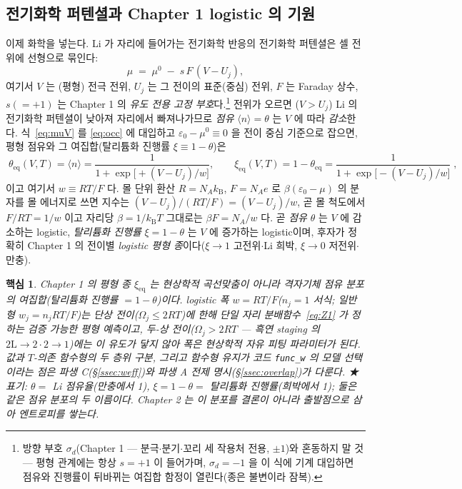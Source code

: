 \documentclass[11pt,a4paper]{article}
\newtheorem*{keybox}{핵심}
\newcommand{\eq}{\mathrm{eq}}
\newcommand{\kB}{k_{\mathrm B}}
\newcommand{\avg}[1]{\langle #1\rangle}
\begin{document}
\subsection{전기화학 퍼텐셜과 Chapter 1 logistic 의 기원}\label{ssec:logistic}
이제 화학을 넣는다. Li 가 자리에 들어가는 전기화학 반응의 전기화학 퍼텐셜은 셀 전위에 선형으로 묶인다:
\begin{equation}
\mu \;=\; \mu^0 \;-\; s\,F\,(V-U_j),
\label{eq:muV}
\end{equation}
여기서 $V$ 는 (평형) 전극 전위, $U_j$ 는 그 전이의 표준(중심) 전위, $F$ 는 Faraday 상수, $s(=+1)$ 는
Chapter 1 의 \emph{유도 전용 고정 부호}다.\footnote{방향 부호 $\sigma_d$(Chapter 1 — 분극$\cdot$분기$\cdot$꼬리
세 작용처 전용, $\pm1$)와 혼동하지 말 것 — 평형 관계에는 항상 $s{=}+1$ 이 들어가며, $\sigma_d{=}-1$ 을 이 식에
기계 대입하면 점유와 진행률이 뒤바뀌는 여집합 함정이 열린다(종은 불변이라 잠복).} 전위가 오르면 ($V>U_j$)
Li 의 전기화학 퍼텐셜이 낮아져 자리에서
빠져나가므로 \emph{점유} $\avg{n}=\theta$ 는 $V$ 에 따라 \emph{감소}한다. 식~\eqref{eq:muV} 를
\eqref{eq:occ} 에 대입하고 $\varepsilon_0-\mu^0\equiv0$ 을 전이 중심 기준으로 잡으면, 평형 점유와 그
여집합(탈리튬화 진행률 $\xi\equiv1-\theta$)은
\begin{equation}
\boxed{\;\theta_\eq(V,T)=\avg{n}=\frac{1}{1+\exp\!\bigl[+(V-U_j)/w\bigr]},\qquad
\xi_\eq(V,T)=1-\theta_\eq=\frac{1}{1+\exp\!\bigl[-(V-U_j)/w\bigr]}\;,}
\label{eq:logistic}
\end{equation}
이고 여기서 $w\equiv RT/F$ 다. 몰 단위 환산 $R=N_A\kB$, $F=N_Ae$ 로 $\beta(\varepsilon_0-\mu)$ 의 분자를
몰 에너지로 쓰면 지수는 $(V-U_j)/(RT/F)=(V-U_j)/w$, 곧 몰 척도에서 $F/RT=1/w$ 이고 자리당
$\beta=1/\kB T$ 그대로는 $\beta F=N_A/w$ 다. 곧 \emph{점유} $\theta$ 는 $V$ 에
감소하는 logistic, \emph{탈리튬화 진행률} $\xi=1-\theta$ 는 $V$ 에 증가하는 logistic이며, 후자가 정확히
Chapter 1 의 전이별 \emph{logistic 평형 종}이다($\xi\to1$ 고전위$\cdot$Li 희박, $\xi\to0$ 저전위$\cdot$만충).

\begin{keybox}
Chapter 1 의 평형 종 $\xi_\eq$ 는 \emph{현상학적 곡선맞춤}이 아니라 \emph{격자기체 점유 분포의 여집합}(탈리튬화
진행률 $=1-\theta$)이다. logistic 폭 $w=RT/F$($n_j{=}1$ 서식; 일반형 $w_j=n_jRT/F$)는 \emph{단상
전이($\Omega_j\le2RT$)에 한해} 단일 자리 분배함수~\eqref{eq:Z1} 가 정하는 검증 가능한 평형 예측이고,
\emph{두-상 전이}($\Omega_j>2RT$ — 흑연 staging 의 $2\mathrm L\!\to\!2\cdot2\!\to\!1$)에는 이 유도가 닿지
않아 폭은 현상학적 자유 피팅 파라미터가 된다. 값과 $T$-의존 함수형의 두 층위 구분, 그리고 함수형 유지가
코드 \texttt{func\_w} 의 모델 선택이라는 점은 파생 C(\S\ref{ssec:weff})와 파생 A 전제 명시(\S\ref{ssec:overlap})가
다룬다. ★표기: $\theta=$ Li 점유율(만충에서 1), $\xi=1-\theta=$ 탈리튬화 진행률(희박에서 1); 둘은 같은 점유
분포의 두 이름이다. Chapter 2 는 이 분포를 결론이 아니라 출발점으로 삼아 엔트로피를 쌓는다.
\end{keybox}
\end{document}
